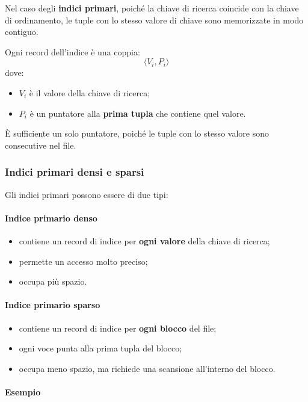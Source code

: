 Nel caso degli \textbf{indici primari}, poiché la chiave di ricerca coincide con la chiave di ordinamento, le tuple con lo stesso valore di chiave sono memorizzate in modo contiguo.

Ogni record dell'indice è una coppia:
\[
\langle V_i, P_i \rangle
\]
dove:
\begin{itemize}
	\item $V_i$ è il valore della chiave di ricerca;
	\item $P_i$ è un puntatore alla \textbf{prima tupla} che contiene quel valore.
\end{itemize}

È sufficiente un solo puntatore, poiché le tuple con lo stesso valore sono consecutive nel file.

\subsubsection{Indici primari densi e sparsi}

Gli indici primari possono essere di due tipi:

\paragraph{Indice primario denso}

\begin{itemize}
	\item contiene un record di indice per \textbf{ogni valore} della chiave di ricerca;
	\item permette un accesso molto preciso;
	\item occupa più spazio.
\end{itemize}

\paragraph{Indice primario sparso}

\begin{itemize}
	\item contiene un record di indice per \textbf{ogni blocco} del file;
	\item ogni voce punta alla prima tupla del blocco;
	\item occupa meno spazio, ma richiede una scansione all'interno del blocco.
\end{itemize}

\paragraph{Esempio}

